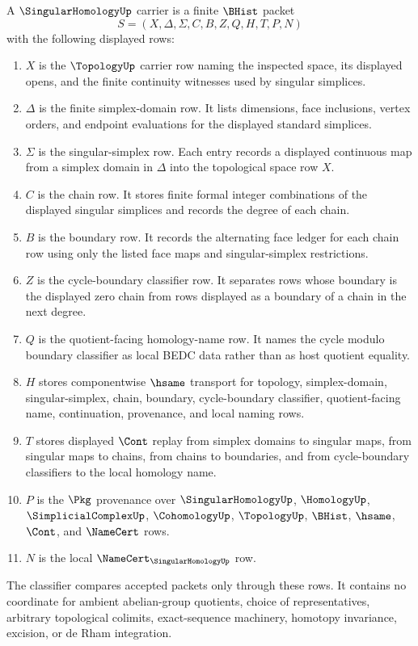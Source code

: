 \begin{definition}\label{def:singular-homology-carrier}
A $\SingularHomologyUp$ carrier is a finite $\BHist$ packet
$$
S=(X,\Delta,\Sigma,C,B,Z,Q,H,T,P,N)
$$
with the following displayed rows:
\begin{enumerate}
\item $X$ is the $\TopologyUp$ carrier row naming the inspected space, its displayed opens, and the finite continuity witnesses used by singular simplices.
\item $\Delta$ is the finite simplex-domain row. It lists dimensions, face inclusions, vertex orders, and endpoint evaluations for the displayed standard simplices.
\item $\Sigma$ is the singular-simplex row. Each entry records a displayed continuous map from a simplex domain in $\Delta$ into the topological space row $X$.
\item $C$ is the chain row. It stores finite formal integer combinations of the displayed singular simplices and records the degree of each chain.
\item $B$ is the boundary row. It records the alternating face ledger for each chain row using only the listed face maps and singular-simplex restrictions.
\item $Z$ is the cycle-boundary classifier row. It separates rows whose boundary is the displayed zero chain from rows displayed as a boundary of a chain in the next degree.
\item $Q$ is the quotient-facing homology-name row. It names the cycle modulo boundary classifier as local BEDC data rather than as host quotient equality.
\item $H$ stores componentwise $\hsame$ transport for topology, simplex-domain, singular-simplex, chain, boundary, cycle-boundary classifier, quotient-facing name, continuation, provenance, and local naming rows.
\item $T$ stores displayed $\Cont$ replay from simplex domains to singular maps, from singular maps to chains, from chains to boundaries, and from cycle-boundary classifiers to the local homology name.
\item $P$ is the $\Pkg$ provenance over $\SingularHomologyUp$, $\HomologyUp$, $\SimplicialComplexUp$, $\CohomologyUp$, $\TopologyUp$, $\BHist$, $\hsame$, $\Cont$, and $\NameCert$ rows.
\item $N$ is the local $\NameCert_{\SingularHomologyUp}$ row.
\end{enumerate}
The classifier compares accepted packets only through these rows. It contains no coordinate for ambient abelian-group quotients, choice of representatives, arbitrary topological colimits, exact-sequence machinery, homotopy invariance, excision, or de Rham integration.
\end{definition}


